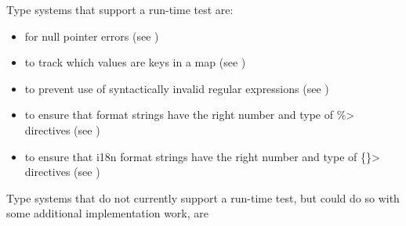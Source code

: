 Type systems that support a run-time test are:
\begin{itemize}
\item
   for null pointer errors
  (see )
\item
   to track which values are
  keys in a map (see )
\item
   to prevent use of syntactically
  invalid regular expressions (see )
\item
   to ensure that format
  strings have the right number and type of \<\%> directives (see
  )
\item
  to ensure that i18n format strings have the right number and type of
  \<\{\}> directives (see )
\end{itemize}


Type systems that do not currently support a run-time test, but could do so with some
additional implementation work, are

